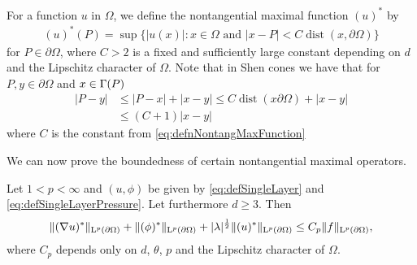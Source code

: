 For a function $u$ in $\Omega$, we define the nontangential maximal function $(u)^*$ by
\begin{align}
  \label{eq:defnNontangMaxFunction}
  (u)^*(P) = \sup\{ |u(x)| \colon x \in \Omega \text{ and } |x - P| < C \operatorname{dist}(x, \partial\Omega)\}
\end{align}
for $P \in \partial\Omega$, where $C > 2$ is a fixed and sufficiently large constant depending on $d$ and the Lipschitz character of $\Omega$.
Note that in Shen cones we have that for $P, y \in \partial\Omega$ and $x \in \Gamma(P)$
\begin{align}
  \label{eq:shenConeEstimate}
  |P - y| 
  &\leq |P - x| + |x - y| 
  \leq C \operatorname{dist}(x \partial\Omega) + |x - y|  \nonumber\\
  &\leq (C + 1) |x - y|
\end{align}
where $C$ is the constant from \eqref{eq:defnNontangMaxFunction}

We can now prove the boundedness of certain nontangential maximal operators.
\begin{lem}
  \label{lem:nontantentialMaximalFunctions}
  Let $1 < p < \infty$ and $(u,\phi)$ be given by \eqref{eq:defSingleLayer} and \eqref{eq:defSingleLayerPressure}.
  Let furthermore $d \geq 3$.
  Then 
  \begin{align}
    \| (\nabla u)^* \|_{\mathrm{L}^p(\partial\Omega)} + \| (\phi)^* \|_{\mathrm{L}^p(\partial\Omega)} + |\lambda|^{\frac{1}{2}} \|(u)^*\|_{\mathrm{L}^p(\partial\Omega)} \leq C_p \|f\|_{\mathrm{L}^p(\partial\Omega)},
  \end{align}
  where $C_p$ depends only on $d$, $\theta$, $p$ and the Lipschitz character of $\Omega$.
\end{lem}

